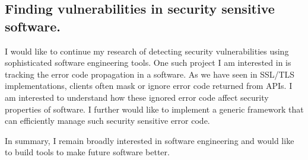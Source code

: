 \documentclass[a4paper, 11pt]{article}
\begin{document}
\begin{small}
\subsection*{\small Finding vulnerabilities in security sensitive software.} 
I would like to continue my research of detecting security vulnerabilities using sophisticated software engineering tools. 
One such project I am interested in is tracking the error code propagation in a software. As we have seen in SSL/TLS implementations, 
clients often mask or ignore error code returned from APIs. I am interested to understand how these ignored error code affect security 
properties of software. I further would like to implement a generic framework that can efficiently manage such security sensitive error code.

In summary, I remain broadly interested in software engineering and would like to build tools to make future software better.



\end{small}
\begin{footnotesize}


\end{footnotesize}
\end{document}
